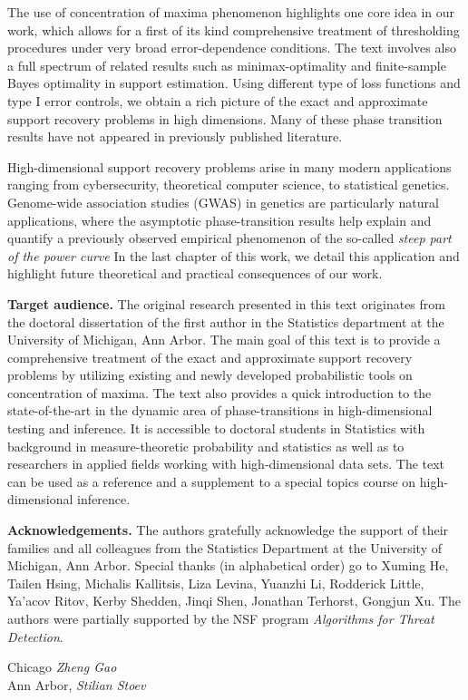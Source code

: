 The use of concentration of maxima phenomenon highlights one core idea in our work, which allows for a first of its kind comprehensive 
treatment of thresholding procedures under very broad error-dependence conditions.  The text involves also a full spectrum of related results 
such as minimax-optimality and finite-sample Bayes optimality in support estimation.  Using different type of loss functions and type I error 
controls, we obtain a rich picture of the exact and approximate support recovery problems in high dimensions.  
Many of these phase transition results have not appeared in previously published literature.  

High-dimensional support recovery problems arise in many modern applications ranging from cybersecurity, theoretical computer science,
to statistical genetics.  Genome-wide association studies (GWAS) in genetics are particularly natural applications, where the asymptotic 
phase-transition results help explain and quantify a previously observed empirical phenomenon of the so-called {\em steep part of the power 
curve}  In the last chapter of this work, we detail this application and highlight future theoretical and practical consequences of our work.


{\bf Target audience.} The original research presented in this text originates from the doctoral dissertation of the first author in the 
Statistics department at the University of Michigan, Ann Arbor.  The main goal of this text is to provide a comprehensive treatment of the
exact and approximate support recovery problems by utilizing existing and newly developed probabilistic tools on concentration of maxima.
The text also provides a quick introduction to the state-of-the-art in the dynamic area of phase-transitions in high-dimensional 
testing and inference.  It is accessible to doctoral students in Statistics with background in measure-theoretic probability and  
statistics as well as to researchers in applied fields working with high-dimensional data sets.  The text can be used as a reference and a
supplement to a special topics course on high-dimensional inference.

{\bf Acknowledgements.} The authors gratefully acknowledge the support of their families and all colleagues from the Statistics Department 
at the University of Michigan, Ann Arbor.   Special thanks (in alphabetical order) go to Xuming He, Tailen Hsing, Michalis Kallitsis, Liza Levina, Yuanzhi Li, Rodderick Little, Ya'acov Ritov, Kerby Shedden, Jinqi Shen, Jonathan Terhorst, Gongjun Xu.
The authors were partially supported by the NSF program {\em Algorithms for Threat Detection}.




\vspace{\baselineskip}
\begin{flushright}\noindent
Chicago \hfill {\it Zheng Gao }\\
Ann Arbor, \DateEdited \hfill {\it Stilian Stoev}\\
\end{flushright}


